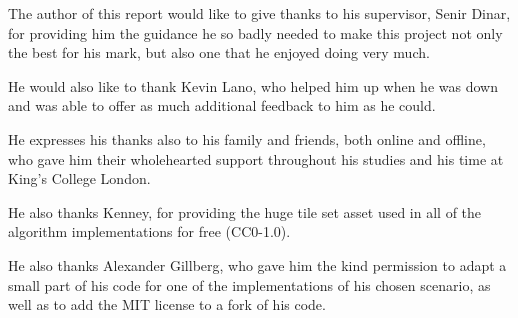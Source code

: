 
The author of this report would like to give thanks to his supervisor, Senir Dinar, for providing him the guidance he so badly needed to make this project not only the best for his mark, but also one that he enjoyed doing very much.

He would also like to thank Kevin Lano, who helped him up when he was down and was able to offer as much additional feedback to him as he could.

He expresses his thanks also to his family and friends, both online and offline, who gave him their wholehearted support throughout his studies and his time at King's College London.

He also thanks Kenney, for providing the huge tile set asset used in all of the algorithm implementations for free (CC0-1.0).

He also thanks Alexander Gillberg, who gave him the kind permission to adapt a small part of his code for one of the implementations of his chosen scenario, as well as to add the MIT license to a fork of his code.

